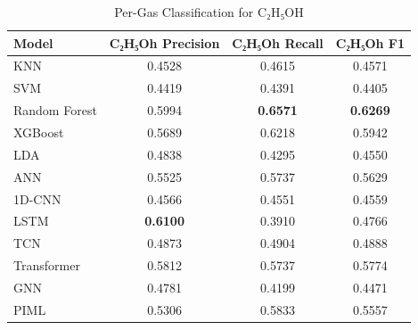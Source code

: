 \begin{table}[htbp]
\centering
\caption{Per-Gas Classification for C₂H₅OH}
\label{tab:C₂H₅OH_detail}
\begin{tabular}{lccc}
\toprule
Model & C₂H₅Oh Precision & C₂H₅Oh Recall & C₂H₅Oh F1 \\
\midrule
KNN & 0.4528 & 0.4615 & 0.4571 \\
SVM & 0.4419 & 0.4391 & 0.4405 \\
Random Forest & 0.5994 & \textbf{0.6571} & \textbf{0.6269} \\
XGBoost & 0.5689 & 0.6218 & 0.5942 \\
LDA & 0.4838 & 0.4295 & 0.4550 \\
ANN & 0.5525 & 0.5737 & 0.5629 \\
1D-CNN & 0.4566 & 0.4551 & 0.4559 \\
LSTM & \textbf{0.6100} & 0.3910 & 0.4766 \\
TCN & 0.4873 & 0.4904 & 0.4888 \\
Transformer & 0.5812 & 0.5737 & 0.5774 \\
GNN & 0.4781 & 0.4199 & 0.4471 \\
PIML & 0.5306 & 0.5833 & 0.5557 \\
\bottomrule
\end{tabular}
\end{table}